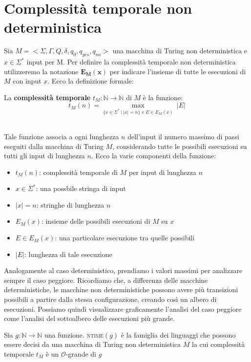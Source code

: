 \section{Complessità temporale non deterministica}
Sia $M = <  \Sigma,\Gamma, Q, \delta, q_0, q_{yes}, q_{no}   >$ una macchina di Turing non deterministica e $x \in \Sigma^*$ input per M. Per definire la complessità temporale non deterministica 
utilizzeremo la notazione $\bm{E_M(x)}$ per indicare l'insieme di tutte le esecuzioni di $M$ con input $x$. Ecco la definizione formale:\smallskip\\
\colorbox{SALZO}{\parbox{\dimexpr\linewidth-2\fboxsep}{\begin{definition}
   La \textbf{complessità temporale} $t_M : \mathbb{N} \to \mathbb{N}$ di $M$ è la funzione:
   \[    t_M(n) = \max_{\{  x \in \Sigma^* \ | \ |x| = n  \}  \text{ e } E \in E_M(x)   }\  |E| \] 
\end{definition}}}\smallskip\\
Tale funzione associa a ogni lunghezza $n$ dell'input il numero massimo di passi eseguiti dalla macchina di Turing $M$, considerando tutte le possibili esecuzioni su tutti gli input di lunghezza $n$. 
Ecco la varie componenti della funzione:
\begin{itemize}
    \item $t_M(n)$: complessità temporale di $M$ per input di lunghezza $n$
    \item $x \in \Sigma^*$: una possbile stringa di input
    \item $|x| = n$: stringhe di lunghezza $n$
    \item $E_M(x)$: insieme delle possibili esecuzioni di $M$ su $x$
    \item $E \in E_M(x)$: una particolare esecuzione tra quelle possibili
    \item $|E|$: lunghezza di tale esecuzione
\end{itemize}
Analogamente al caso deterministico, prendiamo i valori massimi per analizzare sempre il caso peggiore. Ricordiamo che, a differenza delle macchine deterministiche, le macchine non deterministiche possono avere 
più transizioni possibili a partire dalla stessa configurazione, creando così un albero di esecuzioni. Possiamo quindi visualizzare graficamente l'analisi del caso peggiore come l'analisi
 del sottoalbero delle esecuzioni più grande.\smallskip\\
 \colorbox{SALZO}{\parbox{\dimexpr\linewidth-2\fboxsep}{\begin{definition}
    Sia $g: \mathbb{N}\to \mathbb{N}$ una funzione. \textsc{ntime}$(g)$ è la famiglia dei linguaggi che possono essere decisi da una macchina di Turing non deterministica $M$ la cui complessità temporale $t_M$ è
    un $\mathcal{O}$-grande di $g$
\end{definition}}}\smallskip\\
